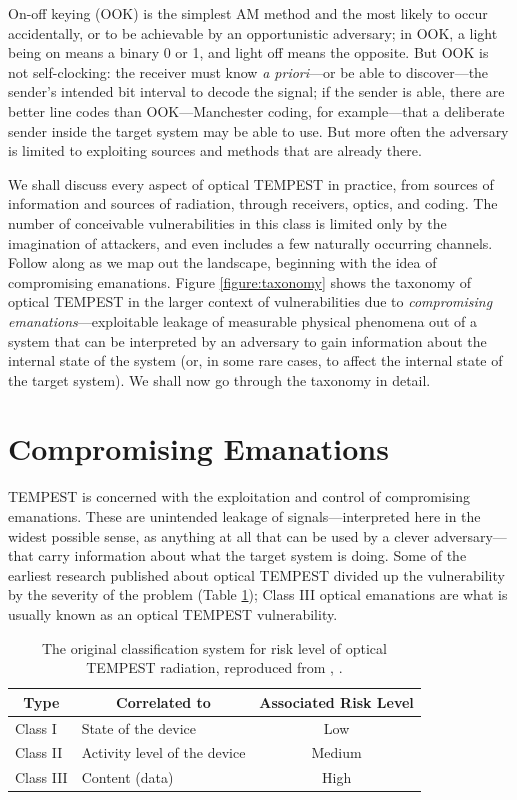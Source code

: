 \documentclass[a4paper,twoside,11pt]{book}
\begin{document}
On-off keying (OOK) is the simplest AM method and the most likely to occur
accidentally, or to be achievable by an opportunistic adversary; in OOK, a
light being on means a binary 0 or 1, and light
off means the opposite. But OOK is not self-clocking: the receiver must
know {\it a priori}---or be able to discover---the sender's intended bit
interval to decode the signal; if the sender is able, there are better line
codes than OOK---Manchester coding, for example---that a deliberate sender
inside the target system may be able to use. But more often the adversary is
limited to exploiting sources and methods that are already there.

We shall discuss every aspect of optical TEMPEST in practice, from sources of
information and sources of radiation, through receivers, optics, and coding.
The number of conceivable vulnerabilities in this class is limited only by the
imagination of attackers, and even includes a few naturally occurring channels.
Follow along as we map out the landscape, beginning with the idea of
compromising emanations.
Figure \ref{figure:taxonomy} shows the taxonomy of optical TEMPEST in the
larger context of vulnerabilities due to \emph{compromising
emanations}---exploitable leakage of measurable physical phenomena out of a
system that can be interpreted by an adversary to gain information about the
internal state of the system (or, in some rare cases, to affect the internal
state of the target system). We shall now go through the taxonomy in detail.
\section{Compromising Emanations}
TEMPEST is concerned with the exploitation and control of compromising
emanations. These are unintended leakage of signals---interpreted here in the
widest possible sense, as anything at all that can be used by a clever
adversary---that carry information about what the target system is doing. Some
of the earliest research published about optical TEMPEST divided up the
vulnerability by the severity of the problem (Table \ref{table:class_III});
Class III optical emanations are what is usually known as an optical TEMPEST
vulnerability.

\begin{table}[ht]
\caption{The original classification system for risk level of optical TEMPEST
radiation, reproduced from \citeauthor{Loughry2002a}, \citeyear{Loughry2002a}.}
\medskip
\label{table:class_III}
\centering
\begin{tabular}{|l|l|c|}
\hline
\multicolumn{1}{|c|}{Type} & \multicolumn{1}{|c|}{Correlated to}
  & Associated Risk Level \bigstrut \\
\hline
\renewcommand{\arraystretch}{1}
Class I & State of the device & Low \\
Class II & Activity level of the device & Medium \\
Class III & Content (data) & High \\
\hline
\end{tabular}
\end{table}
\end{document}

